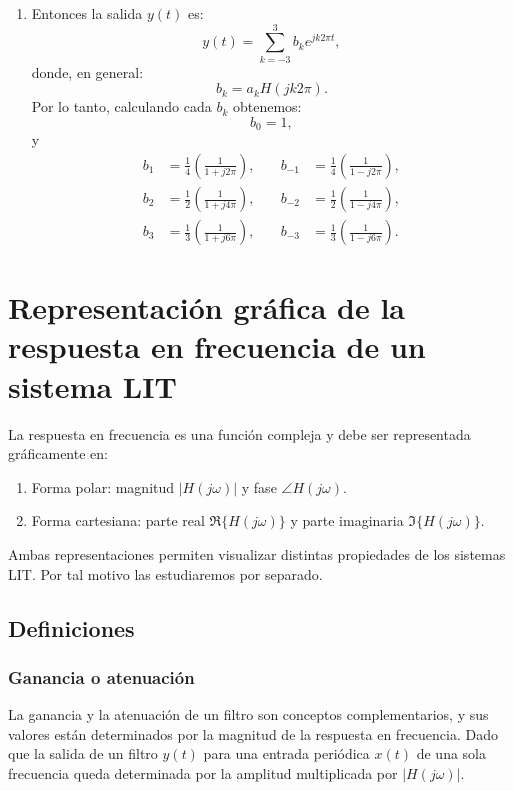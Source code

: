 \begin{enumerate}
	\item Entonces la salida $y(t)$ es:
	\begin{equation}
		y(t) = \sum_{k=-3}^{3} b_{k} e^{jk2\pi t},
	\end{equation}
	donde, en general:
	\begin{equation}
		b_{k} = a_{k} H(jk2\pi).
	\end{equation}
	Por lo tanto, calculando cada $b_{k}$ obtenemos:
	\begin{equation}
		b_{0} = 1,
	\end{equation}
	y
	\begin{equation}
		\begin{aligned}
			b_{1} &= \frac{1}{4}\left( \frac{1}{1+j2\pi} \right), \quad &
			b_{-1} &= \frac{1}{4}\left( \frac{1}{1-j2\pi} \right), \\
			b_{2} &= \frac{1}{2}\left( \frac{1}{1+j4\pi} \right), \quad &
			b_{-2} &= \frac{1}{2}\left( \frac{1}{1-j4\pi} \right), \\
			b_{3} &= \frac{1}{3}\left( \frac{1}{1+j6\pi} \right), \quad &
			b_{-3} &= \frac{1}{3}\left( \frac{1}{1-j6\pi} \right).
		\end{aligned}
	\end{equation}
\end{enumerate}

\section{Representaci\'{o}n gr\'{a}fica de la respuesta en frecuencia de un sistema LIT}

La respuesta en frecuencia es una funci\'{o}n compleja y debe ser representada gr\'{a}ficamente en:
\begin{enumerate}
	\item Forma polar: magnitud $|H(j\omega)|$ y fase $\angle H(j\omega)$.
	\item Forma cartesiana: parte real $\Re\{H(j\omega)\}$ y parte imaginaria $\Im\{H(j\omega)\}$.
\end{enumerate}

Ambas representaciones permiten visualizar distintas propiedades de los sistemas LIT. Por tal motivo las estudiaremos por separado.

\subsection{Definiciones}

\subsubsection{Ganancia o atenuaci\'{o}n}
La ganancia y la atenuaci\'{o}n de un filtro son conceptos complementarios, y sus valores est\'{a}n determinados por la magnitud de la respuesta en frecuencia. Dado que la salida de un filtro $y(t)$ para una entrada peri\'{o}dica $x(t)$ de una sola frecuencia queda determinada por la amplitud multiplicada por $|H(j\omega)|$.

